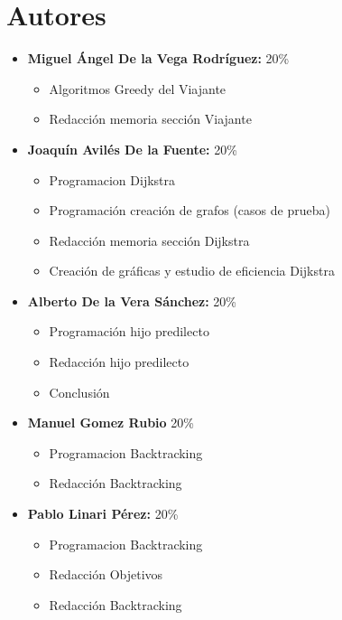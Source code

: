 \documentclass[11pt,openany]{book}
\begin{document}
\tableofcontents %
\newpage %


\chapter{Autores}
\begin{itemize}
      \item \textbf{Miguel Ángel De la Vega Rodríguez:} 20\%
            \begin{itemize}
                  \item Algoritmos Greedy del Viajante
                  \item Redacción memoria sección Viajante
            \end{itemize}
      \item \textbf{Joaquín Avilés De la Fuente:} 20\%
            \begin{itemize}
                  \item Programacion Dijkstra
                  \item Programación creación de grafos (casos de prueba)
                  \item Redacción memoria sección Dijkstra
                  \item Creación de gráficas y estudio de eficiencia Dijkstra
            \end{itemize}
      \item \textbf{Alberto De la Vera Sánchez: } 20\%
            \begin{itemize}
                  \item Programación hijo predilecto
                  \item Redacción hijo predilecto
                  \item Conclusión
            \end{itemize}
      \item \textbf{Manuel Gomez Rubio} 20\%
            \begin{itemize}
                \item Programacion Backtracking
                \item Redacción Backtracking
            \end{itemize}
      \item \textbf{Pablo Linari Pérez:} 20\%
            \begin{itemize}
                  \item Programacion Backtracking
                  \item Redacción Objetivos
                  \item Redacción Backtracking
            \end{itemize}
\end{itemize}
\end{document}
